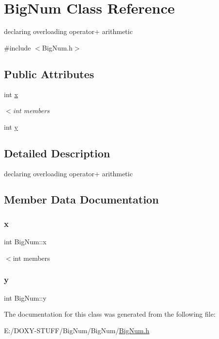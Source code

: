 \hypertarget{class_big_num}{}\section{Big\+Num Class Reference}
\label{class_big_num}


declaring overloading operator+ arithmetic  




{\ttfamily \#include $<$Big\+Num.\+h$>$}

\subsection*{Public Attributes}
\begin{DoxyCompactItemize}
\item 
int \mbox{\hyperlink{class_big_num_a05da8a8e8d63ce5f6063c21f49988ee5}{x}}
\begin{DoxyCompactList}\small\item\em $<$int members \end{DoxyCompactList}\item 
int \mbox{\hyperlink{class_big_num_afa2b6b6f5a6692620732d723830cfa77}{y}}
\end{DoxyCompactItemize}


\subsection{Detailed Description}
declaring overloading operator+ arithmetic 

\subsection{Member Data Documentation}
\mbox{\label{class_big_num_a05da8a8e8d63ce5f6063c21f49988ee5}} 
\subsubsection{\texorpdfstring{x}{x}}
{\footnotesize\ttfamily int Big\+Num\+::x}



$<$int members 

\mbox{\label{class_big_num_afa2b6b6f5a6692620732d723830cfa77}} 
\subsubsection{\texorpdfstring{y}{y}}
{\footnotesize\ttfamily int Big\+Num\+::y}



The documentation for this class was generated from the following file\+:\begin{DoxyCompactItemize}
\item 
E\+:/\+D\+O\+X\+Y-\/\+S\+T\+U\+F\+F/\+Big\+Num/\+Big\+Num/\mbox{\hyperlink{_big_num_8h}{Big\+Num.\+h}}\end{DoxyCompactItemize}
